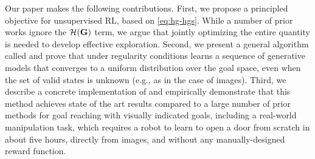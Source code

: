 Our paper makes the following contributions.
First, we propose a principled objective for unsupervised RL, based on \autoref{eq:hg-hgs}.
While a number of prior works ignore the ${\mathcal{H}}(\mathbf{G})$ term, we argue that jointly optimizing the entire quantity is needed to develop effective exploration.
Second, we present a general algorithm called \METHOD and prove that under regularity conditions \METHOD learns a sequence of generative models that converges to a uniform distribution over the goal space, even when the set of valid states is unknown (e.g., as in the case of images).
Third, we describe a concrete implementation of \METHOD and empirically demonstrate that this method achieves state of the art results compared to a large number of prior methods for goal reaching with visually indicated goals, including a real-world manipulation task, which requires a robot to learn to open a door from scratch in about five hours, directly from images, and without any manually-designed reward function.